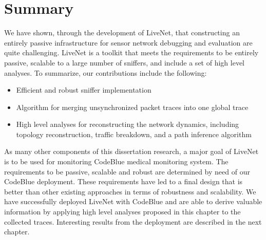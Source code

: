 \section{Summary}
\label{sec-livenet-summary}

We have shown, through the development of LiveNet, that constructing an entirely
passive infrastructure for sensor network debugging and evaluation are quite
challenging. LiveNet is a toolkit that meets the requirements to
be entirely passive, scalable to a large number of sniffers, and include a set
of high level analyses.
To summarize, our contributions include the following:
\begin{itemize}
\item{Efficient and robust sniffer implementation}
\item{Algorithm for merging unsynchronized packet traces into one global trace}
\item{High level analyses for reconstructing the network dynamics, including
topology reconstruction, traffic breakdown, and a path inference algorithm}
\end{itemize}

As many other components of this dissertation research, a major goal of LiveNet is 
to be used for monitoring CodeBlue medical monitoring system. The requirements to be passive,
scalable and robust are determined by need of our CodeBlue deployment.
These requirements have led to a final design that is better than
other existing approaches in terms of robustness and scalability. We have
successfully deployed LiveNet with CodeBlue and are able to derive valuable
information by applying high level analyses proposed in this chapter to the
collected traces. Interesting results from the deployment are described in
the next chapter.

